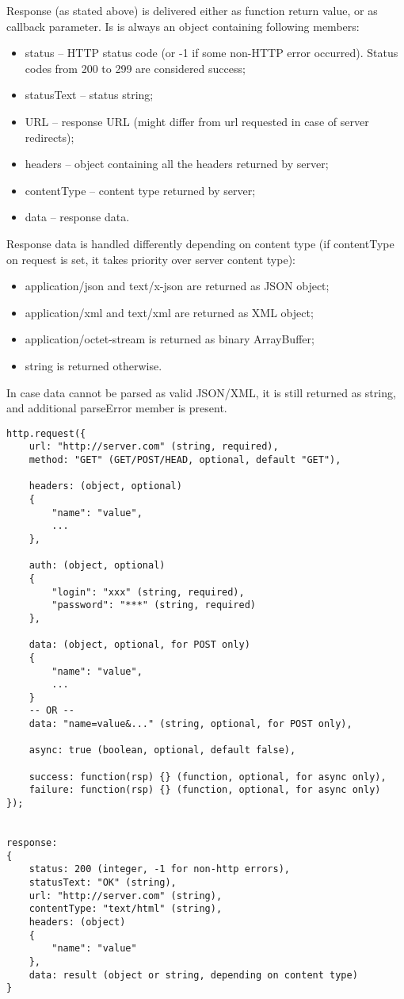 Response (as stated above) is delivered either as function return value, or as callback 
parameter. Is is always an object containing following members:

\begin{itemize}
\item status – HTTP status code (or -1 if some non-HTTP error occurred). Status codes 
from 200 to 299 are considered success;
\item statusText – status string;
\item URL – response URL (might differ from url requested in case of server redirects);
\item headers – object containing all the headers returned by server;
\item contentType – content type returned by server;
\item data – response data.
\end{itemize}


Response data is handled differently depending on content type (if contentType on request is set, it takes priority over server content type):
\begin{itemize}
\item application/json and text/x-json are returned as JSON object;
\item application/xml and text/xml are returned as XML object;
\item application/octet-stream is returned as binary ArrayBuffer;
\item string is returned otherwise.
\end{itemize}
In case data cannot be parsed as valid JSON/XML, it is still returned as string, and additional parseError member is present.


\begin{lstlisting}
http.request({
	url: "http://server.com" (string, required),
	method: "GET" (GET/POST/HEAD, optional, default "GET"),
	
	headers: (object, optional)
	{
		"name": "value",
		...
	},
	
	auth: (object, optional)
	{
		"login": "xxx" (string, required),
		"password": "***" (string, required)
	},
	
	data: (object, optional, for POST only)
	{
		"name": "value",
		...
	}
	-- OR --
	data: "name=value&..." (string, optional, for POST only),

	async: true (boolean, optional, default false),
	
	success: function(rsp) {} (function, optional, for async only),
	failure: function(rsp) {} (function, optional, for async only)
});


response:
{
	status: 200 (integer, -1 for non-http errors),
	statusText: "OK" (string),
	url: "http://server.com" (string),
	contentType: "text/html" (string),
	headers: (object)
	{
		"name": "value"
	},
	data: result (object or string, depending on content type)
}
\end{lstlisting}

